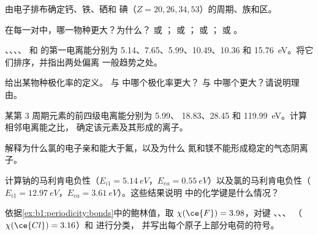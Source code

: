 \begin{exercise}[$\star$]\label{exo:b1:periodicity:1}
由电子排布确定钙、铁、硒和
碘（$Z = 20, 26, 34, 53$）的周期、族和区。
\end{exercise}

\begin{exercise}[$\star$]\label{exo:b1:periodicity:2}
在每一对中，哪一物种更大？为什么？ 或 ；
 或 ； 或 ； 或 。
\end{exercise}

\begin{exercise}[$\star$]\label{exo:b1:periodicity:3}
、、、、
 和  的第一电离能分别为 5.14、7.65、5.99、10.49、10.36 和
\qty{15.76}{eV}。将它们排序，并指出两处偏离
一般趋势之处。
\end{exercise}

\begin{exercise}[$\star$]\label{exo:b1:periodicity:4}
给出某物种极化率的定义。 与
 中哪个极化率更大？ 与  中哪个更大？请说明理由。
\end{exercise}

\begin{exercise}[$\star\star$]\label{exo:b1:periodicity:5}
某第 3 周期元素的前四级电离能分别为 5.99、
18.83、28.45 和 \qty{119.99}{eV}。计算相邻电离能之比，
确定该元素及其形成的离子。
\end{exercise}

\begin{exercise}[$\star\star$]\label{exo:b1:periodicity:6}
解释为什么氯的电子亲和能大于氟，以及为什么
氮和镁不能形成稳定的气态阴离子。
\end{exercise}

\begin{exercise}[$\star\star$]\label{exo:b1:periodicity:7}
计算钠的马利肯电负性（$E_{i1} =
\qty{5.14}{eV}$，$E_{ea} = \qty{0.55}{eV}$）以及氯的马利肯电负性（$E_{i1} =
\qty{12.97}{eV}$，$E_{ea} = \qty{3.61}{eV}$）。这些结果说明
 中的化学键是什么情况？
\end{exercise}

\begin{exercise}[$\star\star$]\label{exo:b1:periodicity:8}
依据\cref{ex:b1:periodicity:bonds}中的鲍林值，取 $\chi(\ce{F})
= 3.98$，对键 、、、
（$\chi(\ce{Cl}) = 3.16$）和  进行分类，
并写出每个原子上部分电荷的符号。
\end{exercise}

